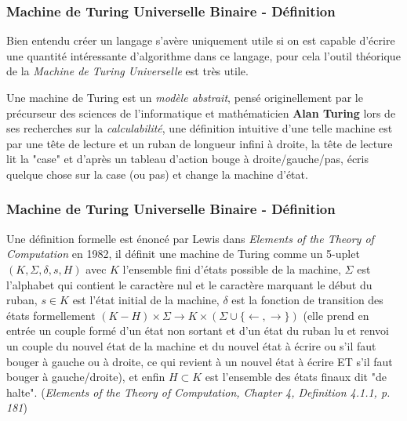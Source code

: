 \documentclass{beamer}
\begin{document}
    \begin{frame}
        \frametitle{Machine de Turing Universelle Binaire - Définition}
        Bien entendu créer un langage s'avère uniquement utile si on est capable d'écrire une quantité intéressante d'algorithme dans 
        ce langage, pour cela l'outil théorique de la \textit{Machine de Turing Universelle} est très utile.\newline

        \pause
        
        Une machine de Turing est un \textit{modèle abstrait}, pensé originellement par le précurseur des sciences de l'informatique 
        et mathématicien \textbf{Alan Turing} lors de ses recherches sur la \textit{calculabilité}, une définition intuitive d'une telle machine 
        est par une tête de lecture et un ruban de longueur infini à droite, la tête de lecture lit la "case" et d'après un tableau d'action bouge à droite/gauche/pas, écris 
        quelque chose sur la case (ou pas) et change la machine d'état.\newline 
    \end{frame}

    \begin{frame}
        \frametitle{Machine de Turing Universelle Binaire - Définition}
        Une définition formelle est énoncé par Lewis dans \textit{Elements of the Theory of Computation} en 1982, il définit une machine de Turing 
        comme un 5-uplet $(K,\Sigma,\delta,s,H)$ avec $K$ l'ensemble fini d'états possible de la machine, $\Sigma$ est l'alphabet qui contient 
        le caractère nul et le caractère marquant le début du ruban, $s \in K$ est l'état initial de la machine, $\delta$ est la fonction 
        de transition des états formellement $(K - H) \times \Sigma \to K \times (\Sigma \cup \{\leftarrow,\rightarrow\})$
        (elle prend en entrée un couple formé d'un état non sortant et d'un état du ruban lu et 
        renvoi un couple du nouvel état de la machine et du nouvel état à écrire ou s'il faut bouger à gauche ou à droite, ce qui 
        revient à un nouvel état à écrire ET s'il faut bouger à gauche/droite), et enfin $H \subset K$ est l'ensemble des états 
        finaux dit "de halte". (\textit{Elements of the Theory of Computation, Chapter 4, Definition 4.1.1, p. 181})\newline
    \end{frame}
\end{document}
